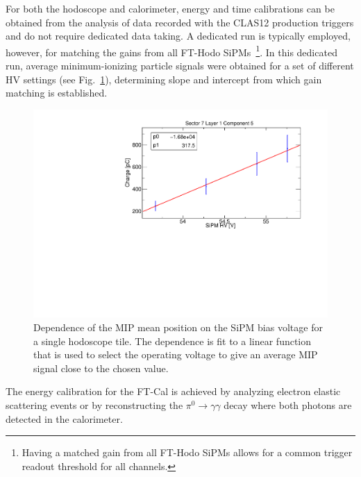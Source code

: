 For both the hodoscope and calorimeter, energy and time calibrations can be obtained from the analysis of data
recorded with the CLAS12 production triggers and do not require dedicated data taking. A dedicated run is
typically employed, however, for matching the gains from all FT-Hodo SiPMs~\footnote{Having a matched gain
from all FT-Hodo SiPMs allows for a common trigger readout threshold for all channels.}. In this dedicated run,
average minimum-ionizing particle signals were obtained for a set of different HV settings (see
Fig.~\ref{fig:fthodo_gainmatch}), determining slope and intercept  from which gain matching is established.

\begin{figure}
\includegraphics[width=1.0\columnwidth]{fig/fthodo_gainmatch.pdf}
\caption{Dependence of the MIP mean position on the SiPM bias voltage for a single hodoscope tile. The dependence
  is fit to a linear function that is used to select the operating voltage to give an average MIP signal close to the chosen
  value.}
\label{fig:fthodo_gainmatch}
\end{figure}

The energy calibration for the FT-Cal is achieved by analyzing electron elastic scattering events or by reconstructing
the $\pi^0\to\gamma\gamma$ decay where both photons are detected in the calorimeter. 

